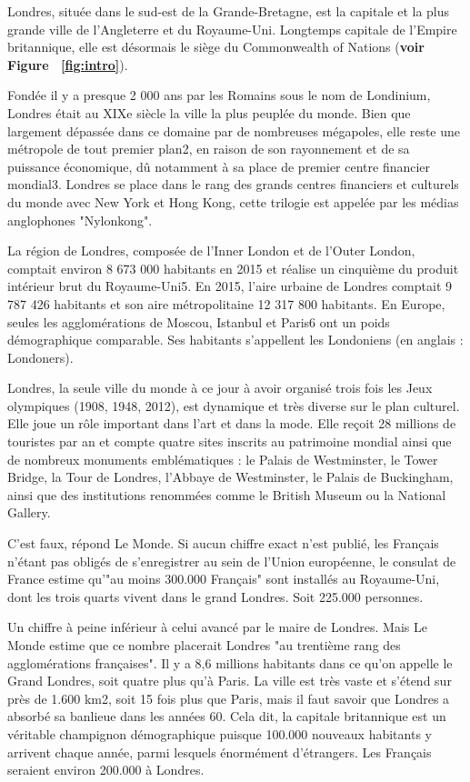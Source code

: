 \documentclass{article}
\begin{document}
Londres, située dans le sud-est de la Grande-Bretagne, est la capitale et la plus grande ville de l'Angleterre et du Royaume-Uni. Longtemps capitale de l'Empire britannique, elle est désormais le siège du Commonwealth of Nations (\textbf{voir Figure ~\ref{fig:intro}}).

Fondée il y a presque 2 000 ans par les Romains sous le nom de Londinium, Londres était au XIXe siècle la ville la plus peuplée du monde. Bien que largement dépassée dans ce domaine par de nombreuses mégapoles, elle reste une métropole de tout premier plan2, en raison de son rayonnement et de sa puissance économique, dû notamment à sa place de premier centre financier mondial3. Londres se place dans le rang des grands centres financiers et culturels du monde avec New York et Hong Kong, cette trilogie est appelée par les médias anglophones "Nylonkong".

La région de Londres, composée de l'Inner London et de l'Outer London, comptait environ 8 673 000 habitants en 2015 et réalise un cinquième du produit intérieur brut du Royaume-Uni5. En 2015, l'aire urbaine de Londres comptait 9 787 426 habitants et son aire métropolitaine 12 317 800 habitants. En Europe, seules les agglomérations de Moscou, Istanbul et Paris6 ont un poids démographique comparable. Ses habitants s'appellent les Londoniens (en anglais : Londoners).

Londres, la seule ville du monde à ce jour à avoir organisé trois fois les Jeux olympiques (1908, 1948, 2012), est dynamique et très diverse sur le plan culturel. Elle joue un rôle important dans l'art et dans la mode. Elle reçoit 28 millions de touristes par an et compte quatre sites inscrits au patrimoine mondial ainsi que de nombreux monuments emblématiques : le Palais de Westminster, le Tower Bridge, la Tour de Londres, l'Abbaye de Westminster, le Palais de Buckingham, ainsi que des institutions renommées comme le British Museum ou la National Gallery.

C'est faux, répond Le Monde. Si aucun chiffre exact n'est publié, les Français n'étant pas obligés de s'enregistrer au sein de l'Union européenne, le consulat de France estime qu'"au moins 300.000 Français" sont installés au Royaume-Uni, dont les trois quarts vivent dans le grand Londres. Soit 225.000 personnes.

Un chiffre à peine inférieur à celui avancé par le maire de Londres. Mais Le Monde estime que ce nombre placerait Londres "au trentième rang des agglomérations françaises".
Il y a 8,6 millions habitants dans ce qu'on appelle le Grand Londres, soit quatre plus qu'à Paris. La ville est très vaste et  s'étend sur près de 1.600 km2, soit 15 fois plus que Paris, mais il faut savoir que Londres a absorbé sa banlieue dans les années 60. Cela dit, la capitale britannique est un véritable champignon démographique puisque 100.000 nouveaux habitants y arrivent chaque année, parmi lesquels énormément d'étrangers. Les Français seraient environ 200.000 à Londres. 
\end{document}
